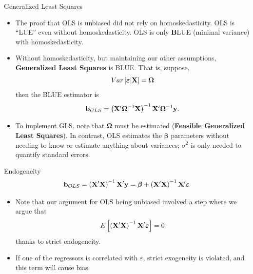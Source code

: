 \documentclass[english,xcolor={dvipsnames},aspectratio=169]{beamer}
\begin{document}
\begin{frame}{Generalized Least Squares}
\begin{itemize}
	\item The proof that OLS is unbiased did not rely on homoskedasticity. OLS
	is ``LUE'' even without homoskedasticity. OLS is only {\bf B}LUE (minimal variance) with homoskedasticity.

	\smallskip
	\item Without homoskedasticity, but maintaining our other assumptions, {\bf Generalized
		Least Squares} is BLUE. That is, suppose,\[
	Var\left[\boldsymbol{\varepsilon} | {\bf X} \right] = \boldsymbol{\Omega}
	\]
	then the BLUE estimator is \[
	{\bf b}_{GLS} = \left({\bf X}'\boldsymbol{\Omega}^{-1}{\bf X}\right)^{-1} {\bf X}' \boldsymbol{\Omega}^{-1}{\bf y} .
	\]
	
	\smallskip
	\item To implement GLS, note that $\boldsymbol{\Omega}$ must be estimated ({\bf Feasible Generalized
		Least Squares}). In contrast, OLS estimates the $\boldsymbol{\beta}$ parameters without needing to know or estimate
		anything about variances; $\sigma^2$ is only needed to quantify standard errors. 
\end{itemize}
\end{frame}



\begin{frame}{Endogeneity}
\[
	{\bf b}_{OLS} = \left({\bf X}'{\bf X}\right)^{-1} {\bf X}' {\bf y} = \boldsymbol{\beta}  + \left({\bf X}'{\bf X}\right)^{-1} {\bf X}' \boldsymbol{\varepsilon}
	\]
\begin{itemize}
		\item Note that our argument for OLS being unbiased involved a step where we argue that \[
	E\left[\left({\bf X}'{\bf X}\right)^{-1} {\bf X}' \boldsymbol{\varepsilon}\right] =0
	\]
	thanks to strict endogeneity.

	\medskip
	\item If one of the regressors is correlated with $\varepsilon$, strict exogeneity is violated, and this term will cause bias. 

\end{itemize}
\end{frame}
\end{document}
